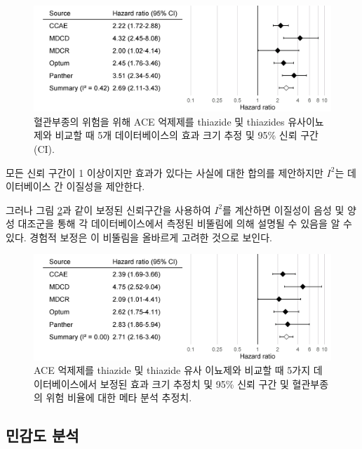 \documentclass[11pt]{book}
\theoremstyle{definition}
\theoremstyle{definition}
\theoremstyle{definition}
\theoremstyle{remark}
\begin{document}
\begin{figure}

{\centering \includegraphics[width=0.9\linewidth]{images/MethodValidity/forest} 

}

\caption{혈관부종의 위험을 위해 ACE 억제제를 thiazide 및 thiazides 유사이뇨제와 비교할 때 5개 데이터베이스의 효과 크기 추정 및 95\% 신뢰 구간(CI).}\label{fig:forest}
\end{figure}

모든 신뢰 구간이 1 이상이지만 효과가 있다는 사실에 대한 합의를
제안하지만 \(I^2\)는 데이터베이스 간 이질성을 제안한다.

그러나 그림 \ref{fig:forestCal}과 같이 보정된 신뢰구간을 사용하여
\(I^2\)를 계산하면 이질성이 음성 및 양성 대조군을 통해 각
데이터베이스에서 측정된 비뚤림에 의해 설명될 수 있음을 알 수 있다.
경험적 보정은 이 비뚤림을 올바르게 고려한 것으로 보인다.

\begin{figure}

{\centering \includegraphics[width=0.9\linewidth]{images/MethodValidity/forestCal} 

}

\caption{ACE 억제제를 thiazide 및 thiazide 유사 이뇨제와 비교할 때 5가지 데이터베이스에서 보정된 효과 크기 추정치 및 95\% 신뢰 구간 및 혈관부종의 위험 비율에 대한 메타 분석 추정치.}\label{fig:forestCal}
\end{figure}

\subsection{민감도 분석}\label{--1}
\end{document}
